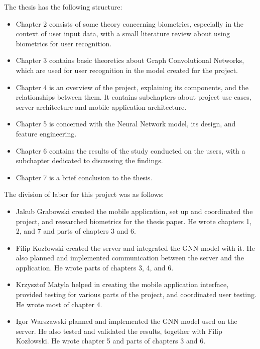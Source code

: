 The thesis has the following structure:
\begin{itemize}
    \item Chapter 2 consists of some theory concerning biometrics, especially in the context of user input data, with a small literature review about using biometrics for user recognition.
    \item Chapter 3 contains basic theoretics about Graph Convolutional Networks, which are used for user recognition in the model created for the project.
    \item Chapter 4 is an overview of the project, explaining its components, and the relationships between them. It contains subchapters about project use cases, server architecture and mobile application architecture.
    \item Chapter 5 is concerned with the Neural Network model, its design, and feature engineering.
    \item Chapter 6 contains the results of the study conducted on the users, with a subchapter dedicated to discussing the findings.
    \item Chapter 7 is a brief conclusion to the thesis.
\end{itemize}

The division of labor for this project was as follows:
\begin{itemize}
    \item Jakub Grabowski created the mobile application, set up and coordinated the project, and researched biometrics for the thesis paper. He wrote chapters 1, 2, and 7 and parts of chapters 3 and 6.
    \item Filip Kozłowski created the server and integrated the GNN model with it. He also planned and implemented communication between the server and the application. He wrote parts of chapters 3, 4, and 6. 
    \item Krzysztof Matyla helped in creating the mobile application interface, provided testing for various parts of the project, and coordinated user testing. He wrote most of chapter 4.
    \item Igor Warszawski planned and implemented the GNN model used on the server. He also tested and validated the results, together with Filip Kozłowski. He wrote chapter 5 and parts of chapters 3 and 6.
\end{itemize}
